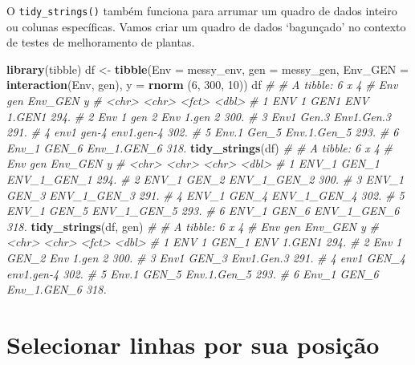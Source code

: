 \documentclass[
]{book}
\newenvironment{Shaded}{\begin{snugshade}}{\end{snugshade}}
\newcommand{\CommentTok}[1]{\textcolor[rgb]{0.56,0.35,0.01}{\textit{#1}}}
\newcommand{\DataTypeTok}[1]{\textcolor[rgb]{0.13,0.29,0.53}{#1}}
\newcommand{\DecValTok}[1]{\textcolor[rgb]{0.00,0.00,0.81}{#1}}
\newcommand{\KeywordTok}[1]{\textcolor[rgb]{0.13,0.29,0.53}{\textbf{#1}}}
\newcommand{\NormalTok}[1]{#1}
\newcommand{\StringTok}[1]{\textcolor[rgb]{0.31,0.60,0.02}{#1}}
\begin{document}
O \texttt{tidy\_strings()} também funciona para arrumar um quadro de dados inteiro ou colunas específicas. Vamos criar um quadro de dados `bagunçado' no contexto de testes de melhoramento de plantas.

\begin{Shaded}
\begin{Highlighting}[]
\KeywordTok{library}\NormalTok{(tibble)}
\NormalTok{df <-}\StringTok{ }\KeywordTok{tibble}\NormalTok{(}\DataTypeTok{Env =}\NormalTok{ messy_env,}
             \DataTypeTok{gen =}\NormalTok{ messy_gen,}
             \DataTypeTok{Env_GEN =} \KeywordTok{interaction}\NormalTok{(Env, gen),}
             \DataTypeTok{y =} \KeywordTok{rnorm}\NormalTok{ (}\DecValTok{6}\NormalTok{, }\DecValTok{300}\NormalTok{, }\DecValTok{10}\NormalTok{))}
\NormalTok{df}
\CommentTok{# # A tibble: 6 x 4}
\CommentTok{#   Env   gen   Env_GEN         y}
\CommentTok{#   <chr> <chr> <fct>       <dbl>}
\CommentTok{# 1 ENV 1 GEN1  ENV 1.GEN1   294.}
\CommentTok{# 2 Env 1 gen 2 Env 1.gen 2  300.}
\CommentTok{# 3 Env1  Gen.3 Env1.Gen.3   291.}
\CommentTok{# 4 env1  gen-4 env1.gen-4   302.}
\CommentTok{# 5 Env.1 Gen_5 Env.1.Gen_5  293.}
\CommentTok{# 6 Env_1 GEN_6 Env_1.GEN_6  318.}
\KeywordTok{tidy_strings}\NormalTok{(df)}
\CommentTok{# # A tibble: 6 x 4}
\CommentTok{#   Env   gen   Env_GEN         y}
\CommentTok{#   <chr> <chr> <chr>       <dbl>}
\CommentTok{# 1 ENV_1 GEN_1 ENV_1_GEN_1  294.}
\CommentTok{# 2 ENV_1 GEN_2 ENV_1_GEN_2  300.}
\CommentTok{# 3 ENV_1 GEN_3 ENV_1_GEN_3  291.}
\CommentTok{# 4 ENV_1 GEN_4 ENV_1_GEN_4  302.}
\CommentTok{# 5 ENV_1 GEN_5 ENV_1_GEN_5  293.}
\CommentTok{# 6 ENV_1 GEN_6 ENV_1_GEN_6  318.}
\KeywordTok{tidy_strings}\NormalTok{(df, gen)}
\CommentTok{# # A tibble: 6 x 4}
\CommentTok{#   Env   gen   Env_GEN         y}
\CommentTok{#   <chr> <chr> <fct>       <dbl>}
\CommentTok{# 1 ENV 1 GEN_1 ENV 1.GEN1   294.}
\CommentTok{# 2 Env 1 GEN_2 Env 1.gen 2  300.}
\CommentTok{# 3 Env1  GEN_3 Env1.Gen.3   291.}
\CommentTok{# 4 env1  GEN_4 env1.gen-4   302.}
\CommentTok{# 5 Env.1 GEN_5 Env.1.Gen_5  293.}
\CommentTok{# 6 Env_1 GEN_6 Env_1.GEN_6  318.}
\end{Highlighting}
\end{Shaded}

\hypertarget{selecionar-linhas-por-sua-posiuxe7uxe3o}{%
\section{Selecionar linhas por sua posição}\label{selecionar-linhas-por-sua-posiuxe7uxe3o}}
\end{document}
